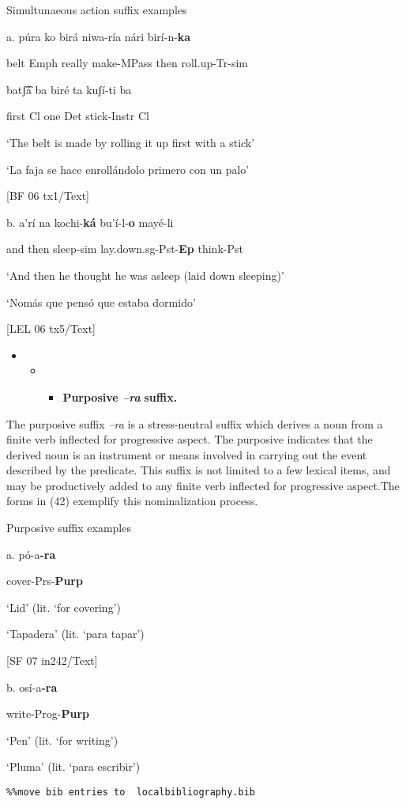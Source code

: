    Simultunaeous action suffix examples

a.    púra   ko       birá     niwa-ría  nári   birí-n-\textbf{ka}        

    belt    Emph   really  make-MPass   then   roll.up-Tr-sim 

    batʃ͡á  ba   biré    ta   kuʃí-ti     ba

first   Cl   one    Det   stick-Instr   Cl

    ‘The belt is made by rolling it up first with a stick’

    ‘La faja se hace enrollándolo primero con un palo’  

    [BF 06 tx1/Text]

b.   a’rí   na      kochi-\textbf{ká}      bu’í-l-\textbf{o}       mayé-li

and   then   sleep-sim   lay.down.sg-Pst-\textbf{Ep}   think-Pst

‘And then he thought he was asleep (laid down sleeping)’

‘Nomás que pensó que estaba dormido’    

[LEL 06 tx5/Text]

\begin{itemize}
\item \begin{itemize}
\item \begin{itemize}
\item \textbf{Purposive \textit{–ra} }\textbf{suffix.}
\end{itemize}
\end{itemize}
\end{itemize}

The purposive suffix \-\textit{–ra} is a stress-neutral suffix which derives a noun from a finite verb inflected for progressive aspect. The purposive indicates that the derived noun is an instrument or means involved in carrying out the event described by the predicate. This suffix is not limited to a few lexical items, and may be productively added to any finite verb inflected for progressive aspect.The forms in (42) exemplify this nominalization process.

   Purposive suffix examples


a.   pó-a\textbf{{}-ra}    



cover-Prs-\textbf{Purp}  



‘Lid’ (lit. ‘for covering’)



‘Tapadera’ (lit. ‘para tapar’)        



[SF 07 in242/Text]


  b.  osí-a\textbf{{}-ra}

\textbf{ }write-Prog-\textbf{Purp}

    ‘Pen’ (lit. ‘for writing’)

    ‘Pluma’ (lit. ‘para escribir’)


\begin{verbatim}%%move bib entries to  localbibliography.bib
\end{verbatim}